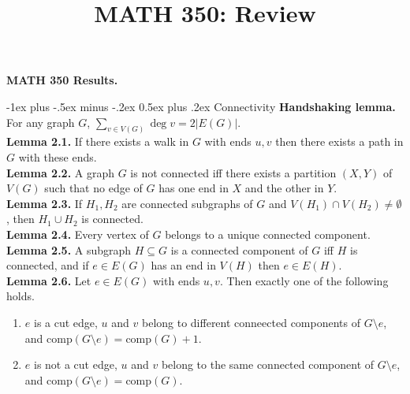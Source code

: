 \documentclass[10pt,landscape]{article}
\title{MATH 350: Review}
\makeatletter
\renewcommand{\section}{\@startsection{section}{1}{0mm}%
                                {-1ex plus -.5ex minus -.2ex}%
                                {0.5ex plus .2ex}%
                                {\normalfont\large\bfseries}}
\makeatother
\begin{document}
\raggedright
\footnotesize

\begin{center}
	\Large{\textbf{MATH 350 Results.}} \\
\end{center}
\begin{multicols}{3}
\setlength{\premulticols}{1pt}
\setlength{\postmulticols}{1pt}
\setlength{\multicolsep}{1pt}
\setlength{\columnsep}{2pt}

\section{Connectivity}
\textbf{Handshaking lemma.} For any graph \( G \), \( \sum_{v \in V(G)}^{}\deg v = 2|E(G)|. \) \\
\textbf{Lemma 2.1.} If there exists a walk in \( G \) with ends \( u,v \) then there exists a path in \( G \) with these ends. \\
\textbf{Lemma 2.2.} A graph \( G \) is not connected iff there exists a partition \( (X,Y) \) of \( V(G) \) such that no edge of \( G \) has one end in \( X \) and the other in \( Y \). \\
\textbf{Lemma 2.3.} If \( H_1, H_2 \) are connected subgraphs of \( G \) and \( V(H_1) \cap V(H_2) \neq \emptyset  \), then \( H_1 \cup H_2 \) is connected. \\
\textbf{Lemma 2.4.} Every vertex of \( G \) belongs to a unique connected component. \\
\textbf{Lemma 2.5.} A subgraph \( H \subseteq G \) is a connected component of \( G \) iff \( H \) is connected, and if \( e \in E(G) \) has an end in \( V(H) \) then \( e \in E(H). \) \\
\textbf{Lemma 2.6.} Let \( e \in E(G) \) with ends \( u,v \). Then exactly one of the following holds.
\begin{enumerate}
	\item \( e \) is a cut edge, \( u \) and \( v \) belong to different conneected components of \( G \setminus e \), and \( \mbox{comp}(G \setminus e) = \mbox{comp}(G) + 1.\)
	\item \( e \) is not a cut edge, \( u \) and \( v \) belong to the same connected component of \( G \setminus e \), and \( \mbox{comp}(G\setminus e ) = \mbox{comp}(G). \) 
\end{enumerate}

\end{multicols}
\end{document}
